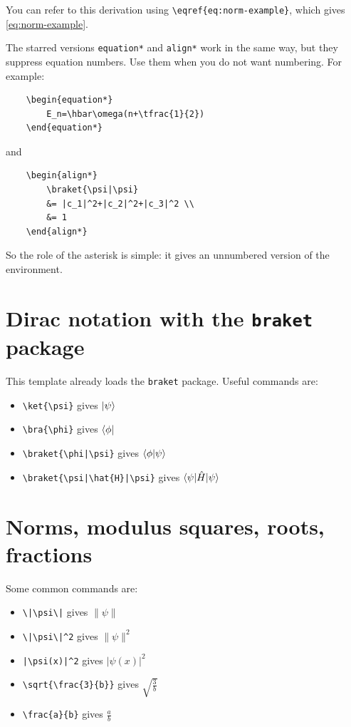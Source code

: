 \documentclass[12pt]{article}
\begin{document}
You can refer to this derivation using \verb|\eqref{eq:norm-example}|, which gives \eqref{eq:norm-example}.

The starred versions \verb|equation*| and \verb|align*| work in the same way, but they suppress equation numbers. Use them when you do not want numbering. For example:

\begin{verbatim}
	\begin{equation*}
		E_n=\hbar\omega(n+\tfrac{1}{2})
	\end{equation*}
\end{verbatim}

and

\begin{verbatim}
	\begin{align*}
		\braket{\psi|\psi}
		&= |c_1|^2+|c_2|^2+|c_3|^2 \\
		&= 1
	\end{align*}
\end{verbatim}

So the role of the asterisk is simple: it gives an unnumbered version of the environment.



\section{Dirac notation with the \texttt{braket} package}
This template already loads the \verb|braket| package. Useful commands are:
\begin{itemize}
\item \verb|\ket{\psi}| gives $\ket{\psi}$
\item \verb|\bra{\phi}| gives $\bra{\phi}$
\item \verb!\braket{\phi|\psi}! gives $\braket{\phi|\psi}$
\item \verb!\braket{\psi|\hat{H}|\psi}! gives $\braket{\psi|\hat{H}|\psi}$
\end{itemize}

\section{Norms, modulus squares, roots, fractions}
Some common commands are:
\begin{itemize}
\item \verb!\|\psi\|! gives $\|\psi\|$
\item \verb!\|\psi\|^2! gives $\|\psi\|^2$
\item \verb!|\psi(x)|^2! gives $|\psi(x)|^2$
\item \verb|\sqrt{\frac{3}{b}}| gives $\sqrt{\frac{3}{b}}$
\item \verb|\frac{a}{b}| gives $\frac{a}{b}$
\end{itemize}
\end{document}
